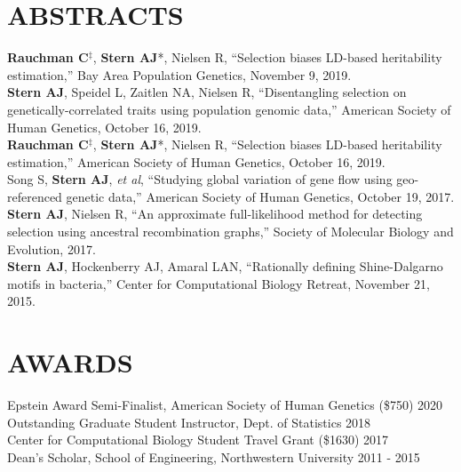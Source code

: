 \documentclass[margin, 10pt]{res} %
\begin{document}
\begin{resume}
\section{ABSTRACTS}
{\bf Rauchman C}$^{\ddag}$, {\bf Stern AJ}*, Nielsen R, ``Selection biases LD-based heritability estimation,'' Bay Area Population Genetics, November 9, 2019.\\
{\bf Stern AJ}, Speidel L, Zaitlen NA, Nielsen R, ``Disentangling selection on genetically-correlated traits using population genomic data,'' American Society of Human Genetics, October 16, 2019.\\
{\bf Rauchman C}$^{\ddag}$, {\bf Stern AJ}*, Nielsen R, ``Selection biases LD-based heritability estimation,'' American Society of Human Genetics, October 16, 2019.\\
Song S, {\bf Stern AJ}, {\it et al}, ``Studying global variation of gene flow using geo-referenced genetic data,'' American Society of Human Genetics, October 19, 2017.\\
{\bf Stern AJ}, Nielsen R, ``An approximate full-likelihood method for detecting selection using ancestral recombination graphs,'' Society of Molecular Biology and Evolution, 2017.\\
{\bf Stern AJ}, Hockenberry AJ,  Amaral LAN, “Rationally defining Shine-Dalgarno motifs in bacteria,” Center for Computational Biology Retreat, November 21, 2015.

\section{AWARDS} 

Epstein Award Semi-Finalist, American Society of Human Genetics (\$750) \hfill 2020\\
Outstanding Graduate Student Instructor, Dept. of Statistics \hfill 2018\\
Center for Computational Biology Student Travel Grant (\$1630) \hfill 2017\\
Dean’s Scholar, School of Engineering, Northwestern University \hfill 2011 - 2015\\


\end{resume}
\end{document}
